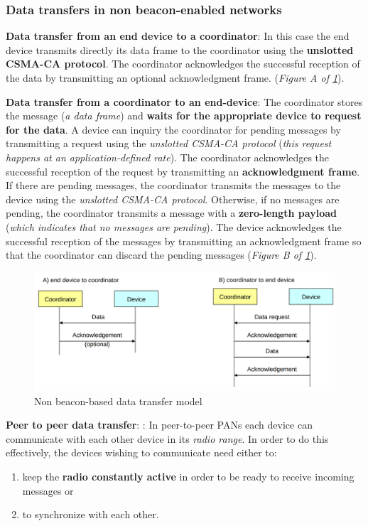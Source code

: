 \documentclass[10pt,a4paper]{report}
\theoremstyle{definition}
\begin{document}
\subsubsection{Data transfers in non beacon-enabled networks}\label{sec:data-transfers-in-non-beacon-enabled-networks}
\textbf{Data transfer from an end device to a coordinator}: In this case the end device transmits directly its data frame to the coordinator using the \textbf{unslotted CSMA-CA protocol}. The coordinator acknowledges the successful reception of the data by transmitting an optional acknowledgment frame. (\textit{Figure A of \ref{non-beacon-based-models}}).

\textbf{Data transfer from a coordinator to an end-device}: The coordinator stores the message (\textit{a data frame}) and \textbf{waits for the appropriate device to request for the data}. A device can inquiry the coordinator for pending messages by transmitting a request using the \textit{unslotted CSMA-CA protocol} (\textit{this request happens at an application-defined rate}).
The coordinator acknowledges the successful reception of the request by transmitting an \textbf{acknowledgment frame}. If there are pending messages, the coordinator transmits the messages to the device using the \textit{unslotted CSMA-CA protocol}. Otherwise, if no messages are pending, the coordinator transmits a message with a \textbf{zero-length payload} (\textit{which indicates that no messages are pending}). The device acknowledges the successful reception of the messages by transmitting an acknowledgment frame so that the coordinator can discard the pending messages (\textit{Figure B of \ref{non-beacon-based-models}}).
\begin{figure}[h!]
	\centering\includegraphics[scale=0.30]{images/Pasted image 20230417091534.png}	\caption{Non beacon-based data transfer model}
	\label{non-beacon-based-models}
\end{figure}

\textbf{Peer to peer data transfer}: : In peer-to-peer PANs each device can communicate with each other device in its \textit{radio range}. In order to do this effectively, the devices wishing to communicate need either to:
\begin{enumerate}
	\item 
	keep the \textbf{radio constantly active} in order to be ready to receive incoming messages or
	\item 
	to synchronize with each other.
\end{enumerate}
\end{document}
